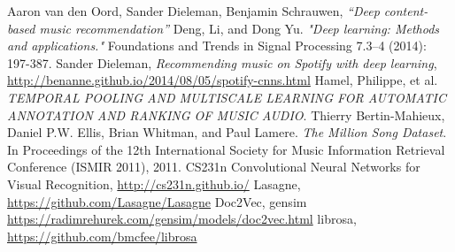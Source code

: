 \documentclass[11pt, a4paper]{article}
\begin{document}
  \begin{thebibliography}{9}
    \sf
      Aaron van den Oord, Sander Dieleman, Benjamin Schrauwen, \emph{``Deep
      content-based music recommendation''}
      Deng, Li, and Dong Yu. \emph{"Deep learning: Methods and applications."}
      Foundations and Trends in Signal Processing 7.3–4 (2014): 197-387.
      Sander Dieleman, \emph{Recommending music on Spotify with deep learning},
      \url{http://benanne.github.io/2014/08/05/spotify-cnns.html}
      Hamel, Philippe, et al. \emph{TEMPORAL POOLING AND MULTISCALE LEARNING
      FOR AUTOMATIC ANNOTATION AND RANKING OF MUSIC AUDIO}.
      Thierry Bertin-Mahieux, Daniel P.W. Ellis, Brian Whitman, and Paul
      Lamere. \emph{The Million Song Dataset}. In Proceedings of the 12th
      International Society for Music Information Retrieval Conference (ISMIR
      2011), 2011.
      CS231n Convolutional Neural Networks for Visual Recognition,
      \url{http://cs231n.github.io/}
      Lasagne, \url{https://github.com/Lasagne/Lasagne}
      Doc2Vec, gensim \url{https://radimrehurek.com/gensim/models/doc2vec.html}
      librosa, \url{https://github.com/bmcfee/librosa}
  \end{thebibliography}
\end{document}
